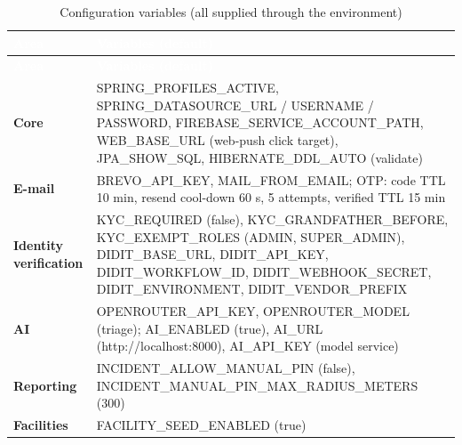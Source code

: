 {\tabfont\rowband
\begin{longtable}{@{}>{\raggedright\arraybackslash}p{}>{\raggedright\arraybackslash}p{}@{}}
\caption{Configuration variables (all supplied through the environment)}\label{tab:config}\\
\rowcolor{najdanavy}\textcolor{white}{\sffamily\bfseries\small Area} & \textcolor{white}{\sffamily\bfseries\small Variables (default)}\\
\endfirsthead
\rowcolor{najdanavy}\textcolor{white}{\sffamily\bfseries\small Area} & \textcolor{white}{\sffamily\bfseries\small Variables (default)}\\
\endhead
\bottomrule\endlastfoot
\textbf{Core} & SPRING\_\allowbreak{}PROFILES\_\allowbreak{}ACTIVE, SPRING\_\allowbreak{}DATASOURCE\_\allowbreak{}URL /\allowbreak{} USERNAME /\allowbreak{} PASSWORD, FIREBASE\_\allowbreak{}SERVICE\_\allowbreak{}ACCOUNT\_\allowbreak{}PATH, WEB\_\allowbreak{}BASE\_\allowbreak{}URL (web-push click target), JPA\_\allowbreak{}SHOW\_\allowbreak{}SQL, HIBERNATE\_\allowbreak{}DDL\_\allowbreak{}AUTO (validate)\\
\textbf{E-mail} & BREVO\_\allowbreak{}API\_\allowbreak{}KEY, MAIL\_\allowbreak{}FROM\_\allowbreak{}EMAIL; OTP: code TTL 10 min, resend cool-down 60 s, 5 attempts, verified TTL 15 min\\
\textbf{Identity verification} & KYC\_\allowbreak{}REQUIRED (false), KYC\_\allowbreak{}GRANDFATHER\_\allowbreak{}BEFORE, KYC\_\allowbreak{}EXEMPT\_\allowbreak{}ROLES (ADMIN, SUPER\_\allowbreak{}ADMIN), DIDIT\_\allowbreak{}BASE\_\allowbreak{}URL, DIDIT\_\allowbreak{}API\_\allowbreak{}KEY, DIDIT\_\allowbreak{}WORKFLOW\_\allowbreak{}ID, DIDIT\_\allowbreak{}WEBHOOK\_\allowbreak{}SECRET, DIDIT\_\allowbreak{}ENVIRONMENT, DIDIT\_\allowbreak{}VENDOR\_\allowbreak{}PREFIX\\
\textbf{AI} & OPENROUTER\_\allowbreak{}API\_\allowbreak{}KEY, OPENROUTER\_\allowbreak{}MODEL (triage); AI\_\allowbreak{}ENABLED (true), AI\_\allowbreak{}URL (http:/\allowbreak{}/\allowbreak{}localhost:8000), AI\_\allowbreak{}API\_\allowbreak{}KEY (model service)\\
\textbf{Reporting} & INCIDENT\_\allowbreak{}ALLOW\_\allowbreak{}MANUAL\_\allowbreak{}PIN (false), INCIDENT\_\allowbreak{}MANUAL\_\allowbreak{}PIN\_\allowbreak{}MAX\_\allowbreak{}RADIUS\_\allowbreak{}METERS (300)\\
\textbf{Facilities} & FACILITY\_\allowbreak{}SEED\_\allowbreak{}ENABLED (true)\\

\end{longtable}}

